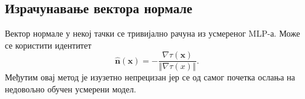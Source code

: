 \documentclass[12pt, a4paper, twoside]{book}
\numberwithin{equation}{chapter}
\numberwithin{theorem}{section}
\numberwithin{definition}{section}
\numberwithin{definitionChapter}{chapter}
\begin{document}
\subsection{Израчунавање вектора нормале}
Вектор нормале у некој тачки се тривијално рачуна из усмереног MLP-а. Може се користити идентитет
	\begin{equation}
		\hat{\textbf{n}}(\textbf{x}) = -\frac{\nabla\tau(\textbf{x})}{\left\Vert\nabla\tau(x)\right\Vert}.
	\end{equation}
Међутим овај метод је изузетно непрецизан јер се од самог почетка ослања на недовољно обучен усмерени модел.

\end{document}

